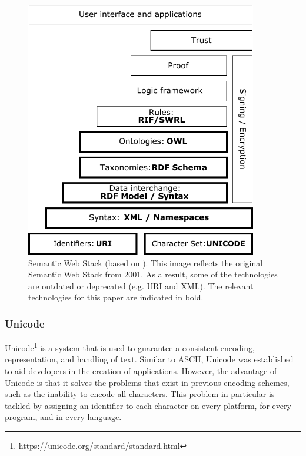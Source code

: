 \begin{figure}[t!]
    \centering
    \includegraphics[width=0.9\textwidth]{images/semantic-web-stack.pdf}
    \caption{Semantic Web Stack (based on \cite{semanticwebstack,semanticwebstack-wiki}). This image reflects the original Semantic Web Stack from 2001. As a result, some of the technologies are outdated or deprecated (e.g. URI and XML). The relevant technologies for this paper are indicated in bold.}
    \label{fig:semanticstack}
\end{figure}

\newpage

\subsubsection{Unicode}
Unicode\footnote{\url{https://unicode.org/standard/standard.html}} is a system that is used to guarantee a consistent encoding, representation, and handling of text. Similar to ASCII, Unicode was established to aid developers in the creation of applications. However, the advantage of Unicode is that it solves the problems that exist in previous encoding schemes, such as the inability to encode all characters. This problem in particular is tackled by assigning an identifier to each character on every platform, for every program, and in every language.

